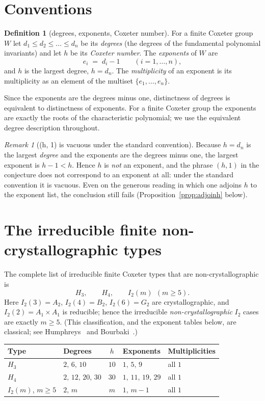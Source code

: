 \documentclass[11pt]{article}
\theoremstyle{definition}
\newtheorem{definition}[theorem]{Definition}
\theoremstyle{remark}
\newtheorem{remark}[theorem]{Remark}
\begin{document}
\section{Conventions}

\begin{definition}[degrees, exponents, Coxeter number]
For a finite Coxeter group $W$ let $d_1 \le d_2 \le \dots \le d_n$ be its
\emph{degrees} (the degrees of the fundamental polynomial invariants) and let
$h$ be its \emph{Coxeter number}. The \emph{exponents} of $W$ are
\[
e_i \;=\; d_i - 1 \qquad (i = 1, \dots, n),
\]
and $h$ is the largest degree, $h = d_n$. The \emph{multiplicity} of an
exponent is its multiplicity as an element of the multiset
$\{e_1, \dots, e_n\}$.
\end{definition}

Since the exponents are the degrees minus one, distinctness of degrees is
equivalent to distinctness of exponents. For a finite Coxeter group the
exponents are exactly the roots of the characteristic polynomial; we use the
equivalent degree description throughout.

\begin{remark}[(h, 1) is vacuous under the standard convention]
\label{rem:hnotexp}
Because $h = d_n$ is the largest \emph{degree} and the exponents are the
degrees minus one, the largest exponent is $h - 1 < h$. Hence $h$ is
\emph{not} an exponent, and the phrase $(h,1)$ in the conjecture does not
correspond to an exponent at all: under the standard convention it is vacuous.
Even on the generous reading in which one adjoins $h$ to the exponent list, the
conclusion still fails (Proposition~\ref{prop:adjoinh} below).
\end{remark}

\section{The irreducible finite non-crystallographic types}

The complete list of irreducible finite Coxeter types that are
non-crystallographic is
\[
H_3, \qquad H_4, \qquad I_2(m)\ \ (m \ge 5).
\]
Here $I_2(3) = A_2$, $I_2(4) = B_2$, $I_2(6) = G_2$ are crystallographic, and
$I_2(2) = A_1 \times A_1$ is reducible; hence the irreducible
\emph{non-crystallographic} $I_2$ cases are exactly $m \ge 5$. (This
classification, and the exponent tables below, are classical; see
Humphreys~\cite{Humphreys} and Bourbaki~\cite{Bourbaki}.)

\begin{center}
\begin{tabular}{l l c l l}
\toprule
Type & Degrees & $h$ & Exponents & Multiplicities \\
\midrule
$H_3$ & $2,\,6,\,10$ & $10$ & $1,\,5,\,9$ & all $1$ \\
$H_4$ & $2,\,12,\,20,\,30$ & $30$ & $1,\,11,\,19,\,29$ & all $1$ \\
$I_2(m)$, $m \ge 5$ & $2,\,m$ & $m$ & $1,\,m-1$ & all $1$ \\
\bottomrule
\end{tabular}
\end{center}
\end{document}
